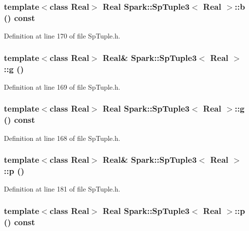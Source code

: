 \subsubsection{\setlength{\rightskip}{0pt plus 5cm}template$<$class Real$>$ Real {\bf Spark::Sp\-Tuple3}$<$ Real $>$::b () const\hspace{0.3cm}{\tt  [inline]}}\label{classSpark_1_1SpTuple3_a12}


Definition at line 170 of file Sp\-Tuple.h.
\subsubsection{\setlength{\rightskip}{0pt plus 5cm}template$<$class Real$>$ Real\& {\bf Spark::Sp\-Tuple3}$<$ Real $>$::g ()\hspace{0.3cm}{\tt  [inline]}}\label{classSpark_1_1SpTuple3_a11}


Definition at line 169 of file Sp\-Tuple.h.
\subsubsection{\setlength{\rightskip}{0pt plus 5cm}template$<$class Real$>$ Real {\bf Spark::Sp\-Tuple3}$<$ Real $>$::g () const\hspace{0.3cm}{\tt  [inline]}}\label{classSpark_1_1SpTuple3_a10}


Definition at line 168 of file Sp\-Tuple.h.
\subsubsection{\setlength{\rightskip}{0pt plus 5cm}template$<$class Real$>$ Real\& {\bf Spark::Sp\-Tuple3}$<$ Real $>$::p ()\hspace{0.3cm}{\tt  [inline]}}\label{classSpark_1_1SpTuple3_a19}


Definition at line 181 of file Sp\-Tuple.h.
\subsubsection{\setlength{\rightskip}{0pt plus 5cm}template$<$class Real$>$ Real {\bf Spark::Sp\-Tuple3}$<$ Real $>$::p () const\hspace{0.3cm}{\tt  [inline]}}\label{classSpark_1_1SpTuple3_a18}


